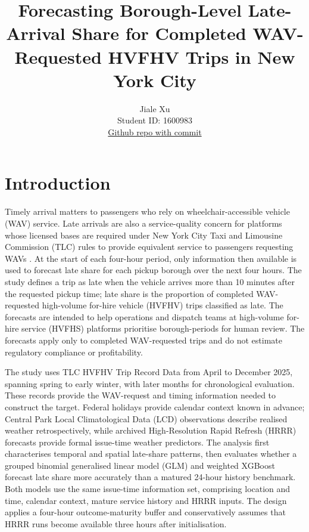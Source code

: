\documentclass[11pt]{article}
\title{\textbf{Forecasting Borough-Level Late-Arrival Share for Completed
WAV-Requested HVFHV Trips in New York City}}
\author{
Jiale Xu \\
Student ID: 1600983 \\
\href{https://github.com/MAST30034-AppliedDataScience/project-1-individual-LavenderLe7/tree/984b3928c6646017ebeeac3b41c1e6479c681964}{Github repo with commit}
}
\begin{document}
\maketitle

\section{Introduction}
Timely arrival matters to passengers who rely on wheelchair-accessible vehicle (WAV) service.
Late arrivals are also a service-quality concern for platforms whose licensed bases are
required under New York City Taxi and Limousine Commission (TLC) rules to provide equivalent
service to passengers requesting WAVs \cite{nyctlc_fhv_accessibility_base}. At the start of
each four-hour period, only information then available is used to forecast late share for
each pickup borough over the next four hours. The study defines a trip as late when the
vehicle arrives more than 10 minutes after the requested pickup time; late share is the
proportion of completed WAV-requested high-volume for-hire vehicle (HVFHV) trips classified
as late. The forecasts are intended to help operations and
dispatch teams at high-volume for-hire service (HVFHS) platforms prioritise borough-periods
for human review. The forecasts apply only to completed WAV-requested
trips and do not estimate regulatory compliance or profitability.

The study uses TLC HVFHV Trip Record Data from April to December 2025, spanning spring to
early winter, with later months for chronological evaluation. These records provide
the WAV-request and timing information needed to construct the target. Federal holidays
provide calendar context known in advance; Central Park Local Climatological Data
(LCD) observations describe realised weather retrospectively, while archived
High-Resolution Rapid Refresh (HRRR) forecasts provide formal issue-time weather predictors.
The analysis first characterises temporal and spatial late-share
patterns, then evaluates whether a grouped binomial generalised linear model (GLM) and
weighted XGBoost forecast late share more accurately than a matured 24-hour history
benchmark. Both models use the same issue-time information set, comprising location and time,
calendar context, mature service history and HRRR inputs. The design applies a four-hour outcome-maturity
buffer and conservatively assumes that HRRR runs become available three hours after initialisation.
\end{document}
